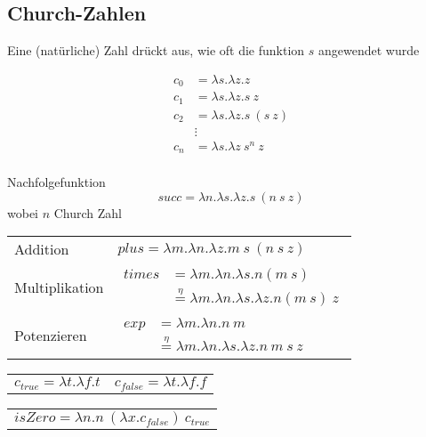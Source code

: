 \documentclass{Zusammenfassung}
\begin{document}
\subsection{Church-Zahlen}\label{subsec:church-zahlen}
Eine (natürliche) Zahl drückt aus, wie oft die funktion $s$ angewendet wurde\\
    \begin{multicols}{2}
        \begin{equation*}
            \begin{aligned}
                c_0 &= \lambda s.\lambda z.z\\
                c_1 &= \lambda s.\lambda z.s\ z\\
                c_2 &= \lambda s. \lambda z.s\ (s\ z)\\
                &\vdots\\
                c_n &= \lambda s. \lambda z\ s^n\ z
        \end{aligned}\label{eq:equation}
        \end{equation*}
        \columnbreak\\
        Nachfolgefunktion \[succ = \lambda n.\lambda s.\lambda z.s\ (n\ s\ z)\]
        wobei $n$ Church Zahl
    \end{multicols}
\begin{table}[H]
    \centering
    \begin{tabularx}{\textwidth}{lX}
        Addition & $plus = \lambda m.\lambda n.\lambda z.m\ s\ (n\ s\ z)$\\
        Multiplikation & $\begin{aligned} times &= \lambda m.\lambda n.\lambda s.n(m\ s)\\&\stackrel{\eta}{=} \lambda m.\lambda n.\lambda s.\lambda z.n(m\ s)\ z\end{aligned}$\\
        Potenzieren & $\begin{aligned} exp &= \lambda m.\lambda n.n\ m\\&\stackrel{\eta}{=}\lambda m.\lambda n.\lambda s.\lambda z.n\ m\ s\ z\end{aligned}$\\
    \end{tabularx}\label{tab:table2}
    \begin{tabularx}{\textwidth}{ll}
        $c_{true}= \lambda t.\lambda f.t$ & $c_{false} = \lambda t.\lambda f.f$\\
    \end{tabularx}
    \begin{tabularx}{\textwidth}{l}
    $isZero = \lambda n.n\ (\lambda x.c_{false})\ c_{true}$
    \end{tabularx}
\end{table}
%
%
\end{document}

